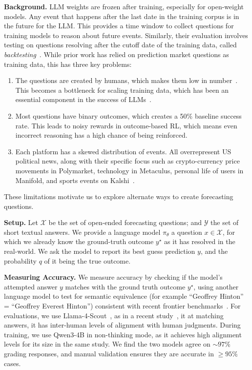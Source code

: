 \textbf{Background.} LLM weights are frozen after training, especially for open-weight models. Any event that happens after the last date in the training corpus is in the future for the LLM. This provides a time window to collect questions for training models to reason about future events. Similarly, their evaluation involves testing on questions resolving after the cutoff date of the training data, called \textit{backtesting}~\citep{Tashman2000}. While prior work has relied on prediction market questions as training data, this has three key problems:
\begin{enumerate}
    \item The questions are created by humans, which makes them low in number~\citep{paleka2025pitfalls}. This becomes a bottleneck for scaling training data, which has been an essential component in the success of LLMs~\citep{kaplan2020scalinglawsneurallanguage, lu2025internet}.
    \item Most questions have binary outcomes, which creates a 50\% baseline success rate. This leads to noisy rewards in outcome-based RL, which means even incorrect reasoning has a high chance of being reinforced.
    \item Each platform has a skewed distribution of events. All overrepresent US political news, along with their specific focus such as crypto-currency price movements in Polymarket, technology in Metaculus, personal life of users in Manifold, and sports events on Kalshi~\citep{paleka2025pitfalls}. 
\end{enumerate}   
These limitations motivate us to explore alternate ways to create forecasting questions.\vspace{0.15cm} 

 \textbf{Setup.} Let $\mathcal{X}$ be the set of open-ended forecasting questions; and $\mathcal{Y}$ the set of short textual answers. We provide a language model $\pi_\theta$ a question $x \in \mathcal{X}$, for which we already know the ground-truth outcome $y^\star$ as it has resolved in the real-world. We ask the model to report its best guess prediction $y$, and the probability $q$ of it being the true outcome. \vspace{0.15cm} 

\textbf{Measuring Accuracy.} We measure accuracy by checking if the model's attempted answer $y$ matches with the ground truth outcome $y^\star$, using another language model to test for semantic equivalence (for example ``Geoffrey Hinton'' = ``Geoffrey Everest Hinton'') consistent with recent frontier benchmarks~\citep{wei2024measuringshortformfactualitylarge, phan2025humanity}. For evaluations, we use Llama-4-Scout~\citep{meta_llama4_2025}, as in a recent study~\citep{chandak2025answer}, it at matching answers, it has inter-human levels of alignment with human judgments. During training, we use Qwen3-4B in non-thinking mode, as it achieves high alignment levels for its size in the same study. We find the two models agree on $\sim 97\%$ grading responses, and manual validation ensures they are accurate in $\ge 95\%$ cases.\vspace{0.15cm} 


